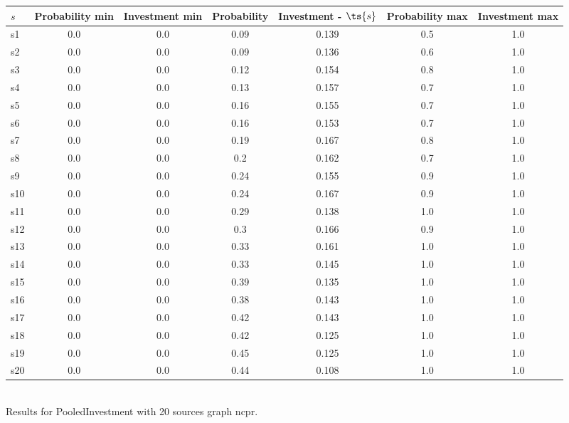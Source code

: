 \documentclass{article}
\begin{document}
\noindent\begin{tabular}{|l|c|c|c|c|c|c|}
\hline
$s$& Probability min & Investment min & Probability & Investment - $\ts{s}$ & Probability max & Investment max\\
\hline
s1 &0.0 & 0.0 & 0.09 & 0.139 & 0.5 & 1.0\\
\hline
s2 &0.0 & 0.0 & 0.09 & 0.136 & 0.6 & 1.0\\
\hline
s3 &0.0 & 0.0 & 0.12 & 0.154 & 0.8 & 1.0\\
\hline
s4 &0.0 & 0.0 & 0.13 & 0.157 & 0.7 & 1.0\\
\hline
s5 &0.0 & 0.0 & 0.16 & 0.155 & 0.7 & 1.0\\
\hline
s6 &0.0 & 0.0 & 0.16 & 0.153 & 0.7 & 1.0\\
\hline
s7 &0.0 & 0.0 & 0.19 & 0.167 & 0.8 & 1.0\\
\hline
s8 &0.0 & 0.0 & 0.2 & 0.162 & 0.7 & 1.0\\
\hline
s9 &0.0 & 0.0 & 0.24 & 0.155 & 0.9 & 1.0\\
\hline
s10 &0.0 & 0.0 & 0.24 & 0.167 & 0.9 & 1.0\\
\hline
s11 &0.0 & 0.0 & 0.29 & 0.138 & 1.0 & 1.0\\
\hline
s12 &0.0 & 0.0 & 0.3 & 0.166 & 0.9 & 1.0\\
\hline
s13 &0.0 & 0.0 & 0.33 & 0.161 & 1.0 & 1.0\\
\hline
s14 &0.0 & 0.0 & 0.33 & 0.145 & 1.0 & 1.0\\
\hline
s15 &0.0 & 0.0 & 0.39 & 0.135 & 1.0 & 1.0\\
\hline
s16 &0.0 & 0.0 & 0.38 & 0.143 & 1.0 & 1.0\\
\hline
s17 &0.0 & 0.0 & 0.42 & 0.143 & 1.0 & 1.0\\
\hline
s18 &0.0 & 0.0 & 0.42 & 0.125 & 1.0 & 1.0\\
\hline
s19 &0.0 & 0.0 & 0.45 & 0.125 & 1.0 & 1.0\\
\hline
s20 &0.0 & 0.0 & 0.44 & 0.108 & 1.0 & 1.0\\
\hline
\end{tabular}\\

\noindent Results for PooledInvestment with 20 sources graph ncpr.
\end{document}
